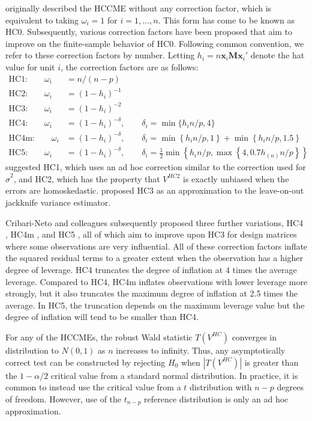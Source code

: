 \documentclass[12pt]{article}\usepackage[]{graphicx}\usepackage[]{color}
\newcommand{\bm}{\mathbf}
\begin{document}
\citet{White1980heteroskedasticity} originally described the HCCME without any correction factor, which is equivalent to taking $\omega_i = 1$ for $i = 1,...,n$. 
This form has come to be known as HC0. 
Subsequently, various correction factors have been proposed that aim to improve on the finite-sample behavior of HC0. 
Following common convention, we refer to these correction factors by number. Letting $h_i = n \bm{x}_i \bm{M} \bm{x}_i'$ denote the hat value for unit $i$, the correction factors are as follows:
\begin{align*}
\text{HC1:} \qquad \omega_i &= n / (n - p) \\
\text{HC2:} \qquad \omega_i &= (1 - h_i)^{-1} \\
\text{HC3:} \qquad \omega_i &= (1 - h_i)^{-2} \\
\text{HC4:} \qquad \omega_i &= (1 - h_i)^{-\delta}, \qquad \delta_i = \min\{h_i n / p, 4\} \\
\text{HC4m:} \qquad \omega_i &= (1 - h_i)^{-\delta}, \qquad \delta_i = \min\left\{h_i n / p, 1 \right\} + \min\left\{h_i n / p, 1.5 \right\} \\
\text{HC5:} \qquad \omega_i &= (1 - h_i)^{-\delta}, \qquad \delta_i = \frac{1}{2}\min\left\{h_i n / p, \max \left\{4, 0.7 h_{(n)} n / p\right\}\right\}
\end{align*}
\citet{MacKinnon1985some} suggested HC1, which uses an ad hoc correction similar to the correction used for $\hat\sigma^2$, and HC2, which has the property that $V^{HC2}$ is exactly unbiased when the errors are homoskedastic. 
\citet{Davidson1993estimation} proposed HC3 as an approximation to the leave-on-out jackknife variance estimator. 

Cribari-Neto and colleagues subsequently proposed three further variations, HC4 \citep{Cribari-Neto2004asymptotic}, HC4m \citep{Cribari-Neto2011new}, and HC5 \citep{Cribari-Neto2007inference}, all of which aim to improve upon HC3 for design matrices where some observations are very influential. 
All of these correction factors inflate the squared residual terms to a greater extent when the observation has a higher degree of leverage. 
HC4 truncates the degree of inflation at 4 times the average leverage. 
Compared to HC4, HC4m inflates observations with lower leverage more strongly, but it also truncates the maximum degree of inflation at 2.5 times the average. 
In HC5, the truncation depends on the maximum leverage value but the degree of inflation will tend to be smaller than HC4. 

For any of the HCCMEs, the robust Wald statistic $T\left(V^{HC}\right)$ converges in distribution to $N(0,1)$ as $n$ increases to infinity. 
Thus, any asymptotically correct test can be constructed by rejecting $H_0$ when $\left|T\left(V^{HC}\right)\right|$ is greater than the $1 - \alpha / 2$ critical value from a standard normal distribution. 
In practice, it is common to instead use the critical value from a $t$ distribution with $n - p$ degrees of freedom. 
However, use of the $t_{n-p}$ reference distribution is only an ad hoc approximation.
\end{document}

